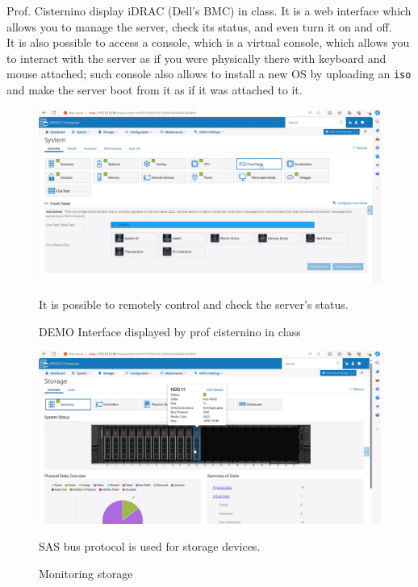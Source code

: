 Prof. Cisternino display iDRAC (Dell's BMC) in class. It is a web interface which allows you to manage the server, check its status, and even turn it on and off. \\
It is also possible to access a console, which is a virtual console, which allows you to interact with the server as if you were physically there with keyboard and mouse attached;
such console also allows to install a new OS by uploading an \texttt{iso} and make the server boot from it as if it was attached to it.
\begin{figure}[htbp]
   \centering
   \includegraphics{images/monitoring_servers.png}
   \caption{DEMO Interface displayed by prof cisternino in class}
   \label{fig:monitoring_servers}
   It is possible to remotely control and check the server's status.
\end{figure}

\begin{figure}[htbp]
   \centering
   \includegraphics{images/monitoring_servers2.png}
   \caption{Monitoring storage}
   \label{fig:monitoring_servers2}
   SAS bus protocol is used for storage devices.
\end{figure}


